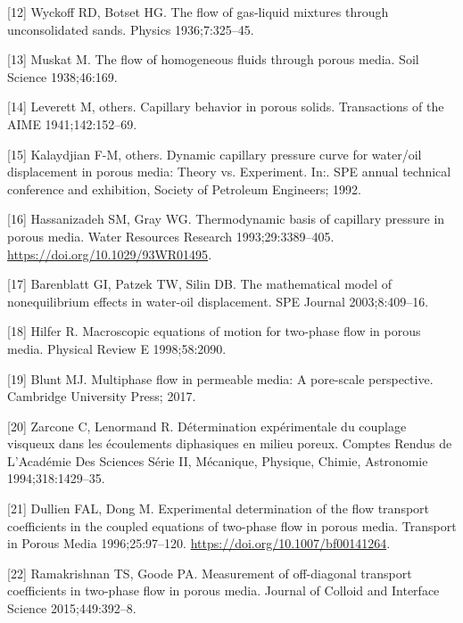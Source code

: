 \documentclass[]{article}
\begin{document}
\leavevmode\hypertarget{ref-wyckoff1936flow}{}%
{[}12{]} Wyckoff RD, Botset HG. The flow of gas-liquid mixtures through
unconsolidated sands. Physics 1936;7:325--45.

\leavevmode\hypertarget{ref-muskat1938flow}{}%
{[}13{]} Muskat M. The flow of homogeneous fluids through porous media.
Soil Science 1938;46:169.

\leavevmode\hypertarget{ref-leverett1941capillary}{}%
{[}14{]} Leverett M, others. Capillary behavior in porous solids.
Transactions of the AIME 1941;142:152--69.

\leavevmode\hypertarget{ref-kalaydjian1992dynamic}{}%
{[}15{]} Kalaydjian F-M, others. Dynamic capillary pressure curve for
water/oil displacement in porous media: Theory vs. Experiment. In:. SPE
annual technical conference and exhibition, Society of Petroleum
Engineers; 1992.

\leavevmode\hypertarget{ref-Hassanizadeh1993}{}%
{[}16{]} Hassanizadeh SM, Gray WG. Thermodynamic basis of capillary
pressure in porous media. Water Resources Research 1993;29:3389--405.
\url{https://doi.org/10.1029/93WR01495}.

\leavevmode\hypertarget{ref-barenblatt2003mathematical}{}%
{[}17{]} Barenblatt GI, Patzek TW, Silin DB. The mathematical model of
nonequilibrium effects in water-oil displacement. SPE Journal
2003;8:409--16.

\leavevmode\hypertarget{ref-hilfer1998macroscopic}{}%
{[}18{]} Hilfer R. Macroscopic equations of motion for two-phase flow in
porous media. Physical Review E 1998;58:2090.

\leavevmode\hypertarget{ref-blunt2017multiphase}{}%
{[}19{]} Blunt MJ. Multiphase flow in permeable media: A pore-scale
perspective. Cambridge University Press; 2017.

\leavevmode\hypertarget{ref-zarcone1994determination}{}%
{[}20{]} Zarcone C, Lenormand R. Détermination expérimentale du couplage
visqueux dans les écoulements diphasiques en milieu poreux. Comptes
Rendus de L'Académie Des Sciences Série II, Mécanique, Physique, Chimie,
Astronomie 1994;318:1429--35.

\leavevmode\hypertarget{ref-Dullien1996}{}%
{[}21{]} Dullien FAL, Dong M. Experimental determination of the flow
transport coefficients in the coupled equations of two-phase flow in
porous media. Transport in Porous Media 1996;25:97--120.
\url{https://doi.org/10.1007/bf00141264}.

\leavevmode\hypertarget{ref-ramakrishnan2015measurement}{}%
{[}22{]} Ramakrishnan TS, Goode PA. Measurement of off-diagonal
transport coefficients in two-phase flow in porous media. Journal of
Colloid and Interface Science 2015;449:392--8.
\end{document}
